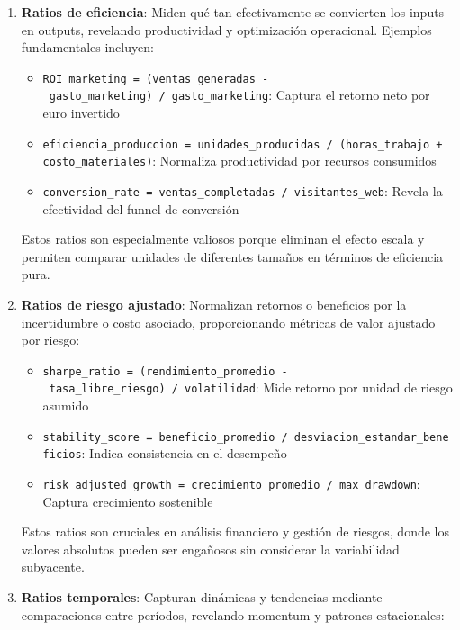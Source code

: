 \documentclass[
  letterpaper,
  DIV=11,
  numbers=noendperiod]{scrreprt}
\providecommand{\tightlist}{%
  \setlength{\itemsep}{0pt}\setlength{\parskip}{0pt}}
\begin{document}
\begin{enumerate}
\def\labelenumi{\arabic{enumi}.}
\item
  \textbf{Ratios de eficiencia}: Miden qué tan efectivamente se
  convierten los inputs en outputs, revelando productividad y
  optimización operacional. Ejemplos fundamentales incluyen:

  \begin{itemize}
  \tightlist
  \item
    \texttt{ROI\_marketing\ =\ (ventas\_generadas\ -\ gasto\_marketing)\ /\ gasto\_marketing}:
    Captura el retorno neto por euro invertido
  \item
    \texttt{eficiencia\_produccion\ =\ unidades\_producidas\ /\ (horas\_trabajo\ +\ costo\_materiales)}:
    Normaliza productividad por recursos consumidos
  \item
    \texttt{conversion\_rate\ =\ ventas\_completadas\ /\ visitantes\_web}:
    Revela la efectividad del funnel de conversión
  \end{itemize}

  Estos ratios son especialmente valiosos porque eliminan el efecto
  escala y permiten comparar unidades de diferentes tamaños en términos
  de eficiencia pura.
\item
  \textbf{Ratios de riesgo ajustado}: Normalizan retornos o beneficios
  por la incertidumbre o costo asociado, proporcionando métricas de
  valor ajustado por riesgo:

  \begin{itemize}
  \tightlist
  \item
    \texttt{sharpe\_ratio\ =\ (rendimiento\_promedio\ -\ tasa\_libre\_riesgo)\ /\ volatilidad}:
    Mide retorno por unidad de riesgo asumido
  \item
    \texttt{stability\_score\ =\ beneficio\_promedio\ /\ desviacion\_estandar\_beneficios}:
    Indica consistencia en el desempeño
  \item
    \texttt{risk\_adjusted\_growth\ =\ crecimiento\_promedio\ /\ max\_drawdown}:
    Captura crecimiento sostenible
  \end{itemize}

  Estos ratios son cruciales en análisis financiero y gestión de
  riesgos, donde los valores absolutos pueden ser engañosos sin
  considerar la variabilidad subyacente.
\item
  \textbf{Ratios temporales}: Capturan dinámicas y tendencias mediante
  comparaciones entre períodos, revelando momentum y patrones
  estacionales:


\end{enumerate}
\end{document}

